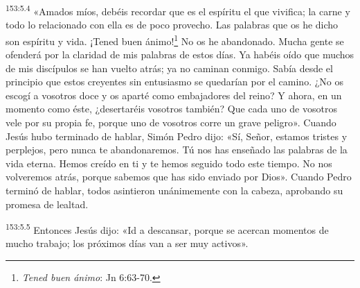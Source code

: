 \par
\textsuperscript{153:5.4} «Amados míos, debéis recordar que es el espíritu el que vivifica; la carne y todo lo relacionado con ella es de poco provecho. Las palabras que os he dicho son espíritu y vida. ¡Tened buen ánimo!\footnote{\textit{Tened buen ánimo}: Jn 6:63-70.} No os he abandonado. Mucha gente se ofenderá por la claridad de mis palabras de estos días. Ya habéis oído que muchos de mis discípulos se han vuelto atrás; ya no caminan conmigo. Sabía desde el principio que estos creyentes sin entusiasmo se quedarían por el camino. ¿No os escogí a vosotros doce y os aparté como embajadores del reino? Y ahora, en un momento como éste, ¿desertaréis vosotros también? Que cada uno de vosotros vele por su propia fe, porque uno de vosotros corre un grave peligro». Cuando Jesús hubo terminado de hablar, Simón Pedro dijo: «Sí, Señor, estamos tristes y perplejos, pero nunca te abandonaremos. Tú nos has enseñado las palabras de la vida eterna. Hemos creído en ti y te hemos seguido todo este tiempo. No nos volveremos atrás, porque sabemos que has sido enviado por Dios». Cuando Pedro terminó de hablar, todos asintieron unánimemente con la cabeza, aprobando su promesa de lealtad.

\par
\textsuperscript{153:5.5} Entonces Jesús dijo: «Id a descansar, porque se acercan momentos de mucho trabajo; los próximos días van a ser muy activos».